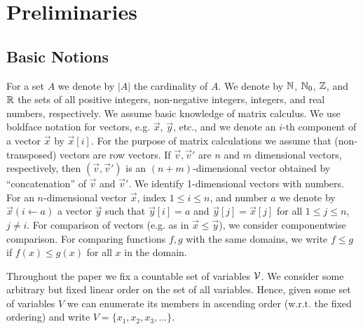 
\vspace{-1em}
\section{Preliminaries}\label{sec:prelim}

\vspace{-1em}
\subsection{Basic Notions}
\vspace{-0.5em}
For a set $A$ we denote by $|A|$ the cardinality of $A$. We denote by $\mathbb{N}$,
$\mathbb{N}_0$, $\mathbb{Z}$, and $\mathbb{R}$ the sets of all positive integers, non-negative
integers, integers, and real numbers, respectively. We assume basic knowledge 
of matrix calculus.
We use boldface notation for
vectors, e.g. $\vec{x}$, $\vec{y}$, etc., and we denote an $i$-th component of a
vector $\vec{x}$ by $\vec{x}[i]$. For the purpose of matrix calculations we 
assume that (non-transposed) vectors are row vectors. If $\vec{v},\vec{v}'$ are 
$n$ and $m$ dimensional vectors, respectively, then $(\vec{v},\vec{v}')$ is an 
$(n+m)$-dimensional vector obtained by ``concatenation'' of $\vec{v}$ and 
$\vec{v}'$. We identify 1-dimensional vectors with numbers. For an 
$n$-dimensional vector 
$\vec{x}$, index $1 \leq i\leq n$, and number $a$ we denote by $\vec{x}(i\leftarrow a)$ 
a 
vector $\vec{y}$ such that $\vec{y}[i]=a$ and $\vec{y}[j]=\vec{x}[j]$ for all 
$1\leq j \leq n$, $j\neq i$.
For comparison of vectors (e.g. as in $\vec{x}\leq \vec{y}$), we consider componentwise 
comparison. 
For comparing functions $f,g$ with the same domains, we write $f\leq g$ 
if $f(x)\leq g(x)$ for all $x$ in the domain.


\smallskip{}
Throughout the paper we fix a countable set of variables $\mathcal{V}$. 
We consider some arbitrary but fixed linear order on the set of all variables. 
Hence, given some set of variables $V$ we can enumerate its members in 
ascending order (w.r.t. the fixed ordering) and write 
$V=\{x_1,x_2,x_3,\dots\}$. 


